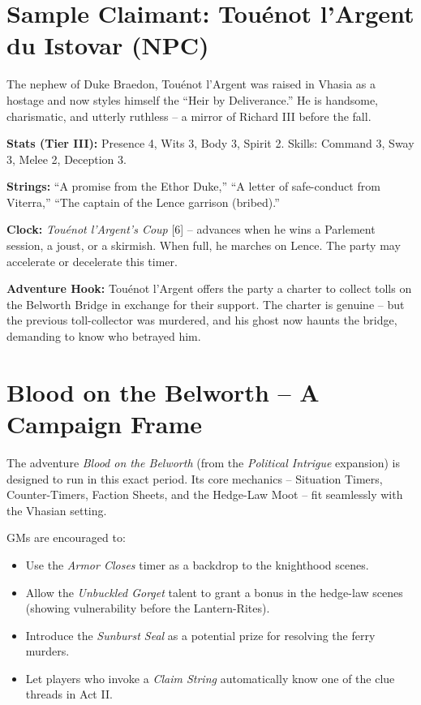 \documentclass[11pt,twoside]{book}
\begin{document}
\section*{Sample Claimant: Touénot l'Argent du Istovar (NPC)}

The nephew of Duke Braedon, Touénot l'Argent was raised in Vhasia as a hostage and now styles himself the ``Heir by Deliverance.'' He is handsome, charismatic, and utterly ruthless -- a mirror of Richard III before the fall.

\textbf{Stats (Tier III):} Presence 4, Wits 3, Body 3, Spirit 2. Skills: Command 3, Sway 3, Melee 2, Deception 3.

\textbf{Strings:} ``A promise from the Ethor Duke,'' ``A letter of safe-conduct from Viterra,'' ``The captain of the Lence garrison (bribed).''

\textbf{Clock:} \textit{Touénot l'Argent's Coup} [6] -- advances when he wins a Parlement session, a joust, or a skirmish. When full, he marches on Lence. The party may accelerate or decelerate this timer.

\textbf{Adventure Hook:} Touénot l'Argent offers the party a charter to collect tolls on the Belworth Bridge in exchange for their support. The charter is genuine -- but the previous toll-collector was murdered, and his ghost now haunts the bridge, demanding to know who betrayed him.

\section*{Blood on the Belworth -- A Campaign Frame}

The adventure \textit{Blood on the Belworth} (from the \textit{Political Intrigue} expansion) is designed to run in this exact period. Its core mechanics -- Situation Timers, Counter-Timers, Faction Sheets, and the Hedge-Law Moot -- fit seamlessly with the Vhasian setting.

GMs are encouraged to:

\begin{itemize}
    \item Use the \textit{Armor Closes} timer as a backdrop to the knighthood scenes.
    \item Allow the \textit{Unbuckled Gorget} talent to grant a bonus in the hedge-law scenes (showing vulnerability before the Lantern-Rites).
    \item Introduce the \textit{Sunburst Seal} as a potential prize for resolving the ferry murders.
    \item Let players who invoke a \textit{Claim String} automatically know one of the clue threads in Act II.
\end{itemize}
\end{document}
